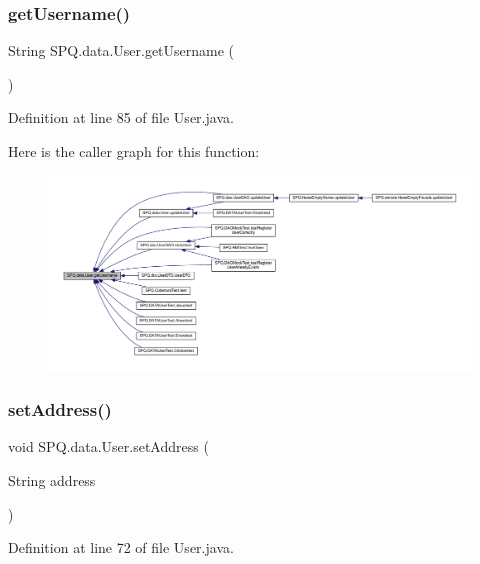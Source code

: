 \subsubsection{\texorpdfstring{get\+Username()}{getUsername()}}
{\footnotesize\ttfamily String S\+P\+Q.\+data.\+User.\+get\+Username (\begin{DoxyParamCaption}{ }\end{DoxyParamCaption})}



Definition at line 85 of file User.\+java.

Here is the caller graph for this function\+:
\nopagebreak
\begin{figure}[H]
\begin{center}
\leavevmode
\includegraphics[width=350pt]{class_s_p_q_1_1data_1_1_user_a55d2e322edbbe446287ce25baecdd421_icgraph}
\end{center}
\end{figure}
\mbox{\label{class_s_p_q_1_1data_1_1_user_ab6e40ae379cda1d98a5873365df30736}} 
\subsubsection{\texorpdfstring{set\+Address()}{setAddress()}}
{\footnotesize\ttfamily void S\+P\+Q.\+data.\+User.\+set\+Address (\begin{DoxyParamCaption}\item[{String}]{address }\end{DoxyParamCaption})}



Definition at line 72 of file User.\+java.

